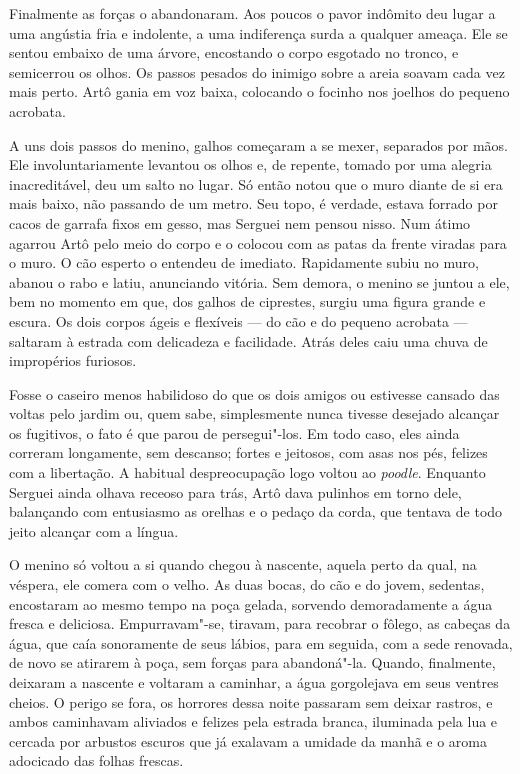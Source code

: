 Finalmente as forças o abandonaram. Aos poucos o pavor indômito deu
lugar a uma angústia fria e indolente, a uma indiferença surda a
qualquer ameaça. Ele se sentou embaixo de uma árvore, encostando o corpo
esgotado no tronco, e semicerrou os olhos. Os passos pesados do inimigo
sobre a areia soavam cada vez mais perto. Artô gania em voz baixa,
colocando o focinho nos joelhos do pequeno acrobata.

A uns dois passos do menino, galhos começaram a se mexer, separados por
mãos. Ele involuntariamente levantou os olhos e, de repente, tomado por
uma alegria inacreditável, deu um salto no lugar. Só então notou que o
muro diante de si era mais baixo, não passando de um metro. Seu topo, é
verdade, estava forrado por cacos de garrafa fixos em gesso, mas Serguei
nem pensou nisso. Num átimo agarrou Artô pelo meio do corpo e o
colocou com as patas da frente viradas para o muro. O cão esperto o
entendeu de imediato. Rapidamente subiu no muro, abanou o rabo e latiu,
anunciando vitória. Sem demora, o menino se juntou a ele, bem no momento
em que, dos galhos de ciprestes, surgiu uma figura grande e escura. Os
dois corpos ágeis e flexíveis --- do cão e do pequeno acrobata --- saltaram à estrada com delicadeza e facilidade. Atrás deles caiu uma chuva de
impropérios furiosos.

Fosse o caseiro menos habilidoso do que os dois amigos ou estivesse
cansado das voltas pelo jardim ou, quem sabe, simplesmente nunca tivesse
desejado alcançar os fugitivos, o fato é que parou de persegui"-los. Em
todo caso, eles ainda correram longamente, sem descanso; fortes e
jeitosos, com asas nos pés, felizes com a libertação. A habitual
despreocupação logo voltou ao \emph{poodle}. Enquanto Serguei ainda olhava
receoso para trás, Artô dava pulinhos em torno dele, balançando
com entusiasmo as orelhas e o pedaço da corda, que tentava de todo jeito
alcançar com a língua.

O menino só voltou a si quando chegou à nascente, aquela perto da qual,
na véspera, ele comera com o velho. As duas bocas, do cão e do jovem,
sedentas, encostaram ao mesmo tempo na poça gelada, sorvendo
demoradamente a água fresca e deliciosa. Empurravam"-se, tiravam, para
recobrar o fôlego, as cabeças da água, que caía sonoramente de seus
lábios, para em seguida, com a sede renovada, de novo se atirarem à
poça, sem forças para abandoná"-la. Quando, finalmente, deixaram a
nascente e voltaram a caminhar, a água gorgolejava em seus ventres
cheios. O perigo se fora, os horrores dessa noite passaram sem deixar
rastros, e ambos caminhavam aliviados e felizes pela estrada branca,
iluminada pela lua e cercada por arbustos escuros que já exalavam a
umidade da manhã e o aroma adocicado das folhas frescas.

